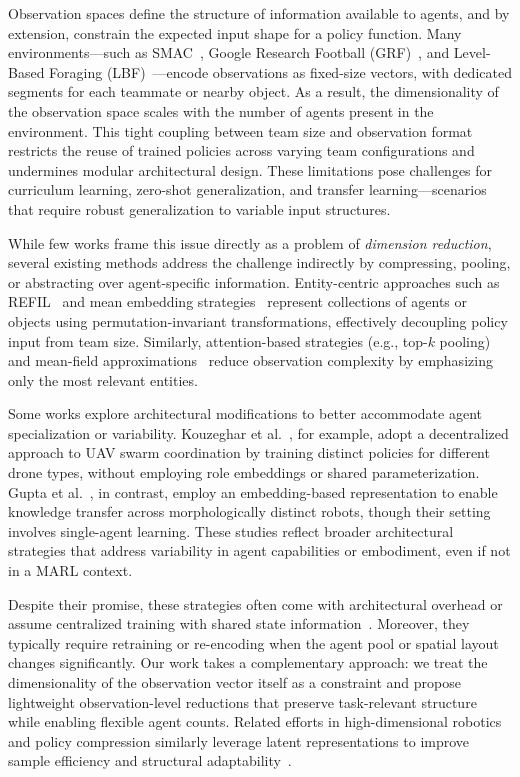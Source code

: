 \documentclass{article}
\begin{document}
Observation spaces define the structure of information available to agents, 
and by extension, constrain the expected input shape for a policy function.
Many environments—such as SMAC~\cite{samvelyan2019}, 
Google Research Football (GRF)~\cite{kurach2020}, 
and Level-Based Foraging (LBF)~\cite{papoudakis2021}—encode observations as fixed-size vectors, 
with dedicated segments for each teammate or nearby object. 
As a result, the dimensionality of the observation space scales with the 
number of agents present in the environment. 
This tight coupling between team size and observation format restricts the 
reuse of trained policies across varying team configurations and undermines 
modular architectural design. These limitations pose challenges for curriculum learning, 
zero-shot generalization, and transfer learning—scenarios that require robust generalization 
to variable input structures.

While few works frame this issue directly as a problem of \textit{dimension reduction}, 
several existing methods address the challenge indirectly by compressing, pooling, 
or abstracting over agent-specific information. Entity-centric approaches such as 
REFIL~\cite{iqbal2021} and mean embedding strategies~\cite{huttenrauch2019} represent 
collections of agents or objects using permutation-invariant transformations, effectively 
decoupling policy input from team size. Similarly, attention-based strategies 
(e.g., top-$k$ pooling) and mean-field approximations~\cite{yang2021a} reduce 
observation complexity by emphasizing only the most relevant entities.

Some works explore architectural modifications to better accommodate agent specialization 
or variability. Kouzeghar et al.~\cite{kouzeghar2023}, for example, adopt a decentralized 
approach to UAV swarm coordination by training distinct policies for different drone types, 
without employing role embeddings or shared parameterization. 
Gupta et al.~\cite{gupta2017a}, in contrast, employ an embedding-based representation to 
enable knowledge transfer across morphologically distinct robots, though their setting 
involves single-agent learning. These studies reflect broader architectural strategies that 
address variability in agent capabilities or embodiment, even if not in a MARL context.

Despite their promise, these strategies often come with architectural overhead or assume 
centralized training with shared state information~\cite{foerster2017}. Moreover, they typically 
require retraining or re-encoding when the agent pool or spatial layout changes significantly. 
Our work takes a complementary approach: we treat the dimensionality of the observation vector 
itself as a constraint and propose lightweight observation-level reductions that preserve 
task-relevant structure while enabling flexible agent counts. Related efforts in 
high-dimensional robotics and policy compression similarly leverage latent representations 
to improve sample efficiency and structural adaptability~\cite{bitzer2010, tangkaratt2016}.
\end{document}
